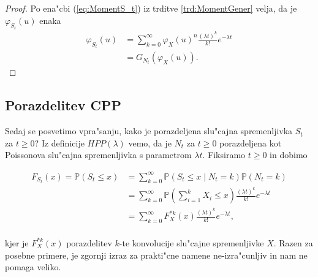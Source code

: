 \documentclass[12pt, a4paper, reqno]{amsart}
\theoremstyle{definition}
\theoremstyle{plain}
\newcommand{\Prob}{\mathbb{P}}
\newcommand{\1}{\mathds{1}}
\begin{document}
    \begin{proof}
        Po ena"cbi (\ref{eq:MomentS_t}) iz trditve \ref{trd:MomentGener} velja, da je $\varphi_{S_t}(u)$ enaka
        \begin{align*}
            \varphi_{S_t}(u) &= \sum_{k=0}^{\infty}
            \varphi_X(u)^n\frac{(\lambda t)^k}{k!}e^{-\lambda t} \\
            &= G_{N_t}\left(\varphi_X(u)\right).
        \end{align*}
    \end{proof}

    \subsection{Porazdelitev CPP}
    Sedaj se posvetimo vpra"sanju, kako je porazdeljena slu"cajna spremenljivka $S_t$ za $t\geq 0$? 
    Iz definicije $HPP(\lambda)$ vemo, da je $N_t$ za $t\geq0$ porazdeljena kot Poissonova slu"cajna 
    spremenljivka s parametrom $\lambda t$. Fiksiramo $t\geq0$ in dobimo 

    \begin{align*}
        F_{S_t}(x) = \Prob(S_t \leq x) 
        &= \sum_{k=0}^\infty \Prob(S_t \leq x \mid N_t = k)\Prob(N_t = k) \\
        & = \sum_{k=0}^\infty \Prob(\sum_{i=1}^k X_i \leq x)\frac{(\lambda t)^k}{k!}e^{-\lambda t} \\
        & = \sum_{k=0}^\infty F_X^{*k}(x)\frac{(\lambda t)^k}{k!}e^{-\lambda t}, \\
    \end{align*}

    \noindent
    kjer je $F_X^{*k}(x)$ porazdelitev $k$-te konvolucije slu"cajne spremenljivke $X$. Razen za 
    posebne primere, je zgornji izraz za prakti"cne namene ne-izra"cunljiv in nam ne pomaga veliko.
    
\end{document}
